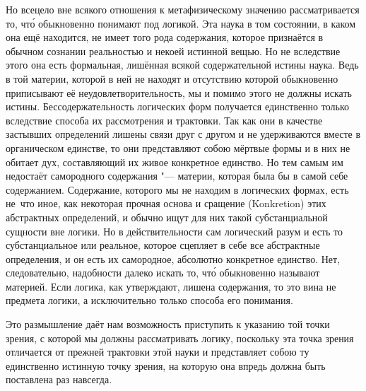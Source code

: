 Но всецело вне всякого отношения к метафизическому значению рассматривается
то, чт\'{о} обыкновенно понимают под логикой. Эта наука в том состоянии, в
каком она ещё находится, не имеет того рода содержания, которое признаётся
в обычном сознании реальностью и некоей истинной вещью. Но не вследствие
этого она есть формальная, лишённая всякой содержательной истины наука.
Ведь в той материи, которой в ней не находят и отсутствию которой
обыкновенно приписывают её неудовлетворительность, мы и помимо этого не
должны искать истины. Бессодержательность логических форм получается
единственно только вследствие способа их рассмотрения и трактовки. Так как
они в качестве застывших определений лишены связи друг с другом и не
удерживаются вместе в органическом единстве, то они представляют собою
мёртвые формы и в них не обитает дух, составляющий их живое конкретное
единство. Но тем самым им недостаёт самородного содержания "--- материи,
которая была бы в самой себе содержанием. Содержание, которого мы не
находим в логических формах, есть не~что иное, как некоторая прочная основа
и сращение (Konkretion) этих абстрактных определений, и обычно ищут для них
такой субстанциальной сущности вне логики. Но в действительности сам
логический разум и есть то субстанциальное или реальное, которое сцепляет в
себе все абстрактные определения, и он есть их самородное, абсолютно
конкретное единство. Нет, следовательно, надобности далеко искать то, чт\'{о}
обыкновенно называют материей. Если логика, как утверждают, лишена
содержания, то это вина не предмета логики, а исключительно только способа
его понимания.

Это размышление даёт нам возможность приступить к указанию той точки зрения,
с которой мы должны рассматривать логику, поскольку эта точка зрения
отличается от прежней трактовки этой науки и представляет собою ту
единственно истинную точку зрения, на которую она впредь должна быть
поставлена раз навсегда.

